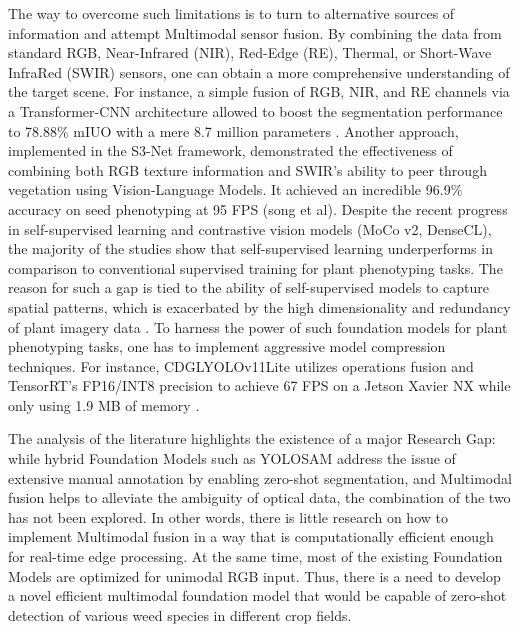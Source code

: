 The way to overcome such limitations is to turn to alternative sources of information and attempt Multimodal sensor fusion. By combining the data from standard RGB, Near-Infrared (NIR), Red-Edge (RE), Thermal, or Short-Wave InfraRed (SWIR) sensors, one can obtain a more comprehensive understanding of the target scene. For instance, a simple fusion of RGB, NIR, and RE channels via a Transformer-CNN architecture allowed to boost the segmentation performance to 78.88\% mIUO with a mere 8.7 million parameters \cite{galymzhankyzy2025}. Another approach, implemented in the S3-Net framework, demonstrated the effectiveness of combining both RGB texture information and SWIR’s ability to peer through vegetation using Vision-Language Models. It achieved an incredible 96.9\% accuracy on seed phenotyping at 95 FPS (song et al). Despite the recent progress in self-supervised learning and contrastive vision models (MoCo v2, DenseCL), the majority of the studies show that self-supervised learning underperforms in comparison to conventional supervised training for plant phenotyping tasks. The reason for such a gap is tied to the ability of self-supervised models to capture spatial patterns, which is exacerbated by the high dimensionality and redundancy of plant imagery data \cite{ogidi2023}. To harness the power of such foundation models for plant phenotyping tasks, one has to implement aggressive model compression techniques. For instance, CDGLYOLOv11Lite utilizes operations fusion and TensorRT’s FP16/INT8 precision to achieve 67 FPS on a Jetson Xavier NX while only using 1.9 MB of memory \cite{mo2025}.

The analysis of the literature highlights the existence of a major Research Gap: while hybrid Foundation Models such as YOLOSAM address the issue of extensive manual annotation by enabling zero-shot segmentation, and Multimodal fusion helps to alleviate the ambiguity of optical data, the combination of the two has not been explored. In other words, there is little research on how to implement Multimodal fusion in a way that is computationally efficient enough for real-time edge processing. At the same time, most of the existing Foundation Models are optimized for unimodal RGB input. Thus, there is a need to develop a novel efficient multimodal foundation model that would be capable of zero-shot detection of various weed species in different crop fields.